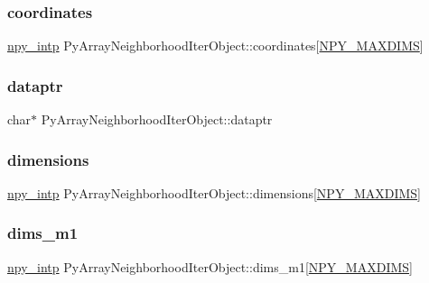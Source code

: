\subsubsection{\texorpdfstring{coordinates}{coordinates}}
{\footnotesize\ttfamily \hyperlink{npy__common_8h_a2d6effc4d5ecb85675ebfcfaa102b483}{npy\+\_\+intp} Py\+Array\+Neighborhood\+Iter\+Object\+::coordinates\mbox{[}\hyperlink{ndarraytypes_8h_a737679ea9ee902bfa707c146051c17b5}{N\+P\+Y\+\_\+\+M\+A\+X\+D\+I\+MS}\mbox{]}}

\mbox{\label{structPyArrayNeighborhoodIterObject_a5457d4a9e37bdc6d33f27bf8667785b0}} 
\subsubsection{\texorpdfstring{dataptr}{dataptr}}
{\footnotesize\ttfamily char$\ast$ Py\+Array\+Neighborhood\+Iter\+Object\+::dataptr}

\mbox{\label{structPyArrayNeighborhoodIterObject_afc65213fc7f4c943f1fc6de5883ed074}} 
\subsubsection{\texorpdfstring{dimensions}{dimensions}}
{\footnotesize\ttfamily \hyperlink{npy__common_8h_a2d6effc4d5ecb85675ebfcfaa102b483}{npy\+\_\+intp} Py\+Array\+Neighborhood\+Iter\+Object\+::dimensions\mbox{[}\hyperlink{ndarraytypes_8h_a737679ea9ee902bfa707c146051c17b5}{N\+P\+Y\+\_\+\+M\+A\+X\+D\+I\+MS}\mbox{]}}

\mbox{\label{structPyArrayNeighborhoodIterObject_a7eb9d5d1cc1a1ce55d7f14dcbeeb29e0}} 
\subsubsection{\texorpdfstring{dims\+\_\+m1}{dims\_m1}}
{\footnotesize\ttfamily \hyperlink{npy__common_8h_a2d6effc4d5ecb85675ebfcfaa102b483}{npy\+\_\+intp} Py\+Array\+Neighborhood\+Iter\+Object\+::dims\+\_\+m1\mbox{[}\hyperlink{ndarraytypes_8h_a737679ea9ee902bfa707c146051c17b5}{N\+P\+Y\+\_\+\+M\+A\+X\+D\+I\+MS}\mbox{]}}

